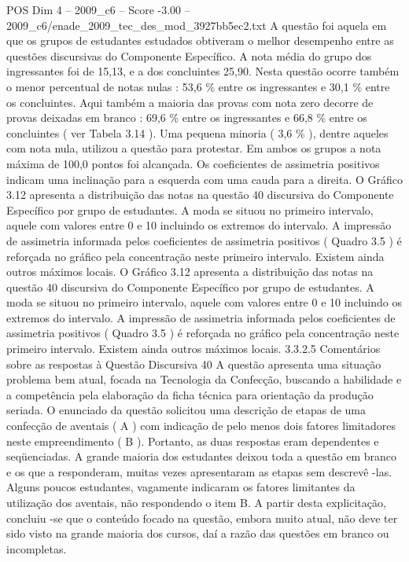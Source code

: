 \begin{textsample}{POS Dim 4 – 2009\_c6 – Score -3.00 – 2009\_c6/enade\_2009\_tec\_des\_mod\_3927bb5ec2.txt}
A questão foi aquela em que os grupos de estudantes estudados obtiveram o melhor desempenho entre as questões discursivas do Componente Específico.
A nota média do grupo dos ingressantes foi de 15,13, e a dos concluintes 25,90.
Nesta questão ocorre também o menor percentual de notas nulas : 53,6 \% entre os ingressantes e 30,1 \% entre os concluintes.
Aqui também a maioria das provas com nota zero decorre de provas deixadas em branco : 69,6 \% entre os ingressantes e 66,8 \% entre os concluintes ( ver Tabela 3.14 ).
Uma pequena minoria ( 3,6 \% ), dentre aqueles com nota nula, utilizou a questão para protestar.
Em ambos os grupos a nota máxima de 100,0 pontos foi alcançada.
Os coeficientes de assimetria positivos indicam uma inclinação para a esquerda com uma cauda para a direita.
O Gráfico 3.12 apresenta a distribuição das notas na questão 40 discursiva do Componente Específico por grupo de estudantes.
A moda se situou no primeiro intervalo, aquele com valores entre 0 e 10 incluindo os extremos do intervalo.
A impressão de assimetria informada pelos coeficientes de assimetria positivos ( Quadro 3.5 ) é reforçada no gráfico pela concentração neste primeiro intervalo.
Existem ainda outros máximos locais.
O Gráfico 3.12 apresenta a distribuição das notas na questão 40 discursiva do Componente Específico por grupo de estudantes.
A moda se situou no primeiro intervalo, aquele com valores entre 0 e 10 incluindo os extremos do intervalo.
A impressão de assimetria informada pelos coeficientes de assimetria positivos ( Quadro 3.5 ) é reforçada no gráfico pela concentração neste primeiro intervalo.
Existem ainda outros máximos locais. 3.3.2.5 Comentários sobre as respostas à Questão Discursiva 40 A questão apresenta uma situação problema bem atual, focada na Tecnologia da Confecção, buscando a habilidade e a competência pela elaboração da ficha técnica para orientação da produção seriada.
O enunciado da questão solicitou uma descrição de etapas de uma confecção de aventais ( A ) com indicação de pelo menos dois fatores limitadores neste empreendimento ( B ).
Portanto, as duas respostas eram dependentes e seqüenciadas.
A grande maioria dos estudantes deixou toda a questão em branco e os que a responderam, muitas vezes apresentaram as etapas sem descrevê -las.
Alguns poucos estudantes, vagamente indicaram os fatores limitantes da utilização dos aventais, não respondendo o item B.
A partir desta explicitação, concluiu -se que o conteúdo focado na questão, embora muito atual, não deve ter sido visto na grande maioria dos cursos, daí a razão das questões em branco ou incompletas.

\end{textsample}
